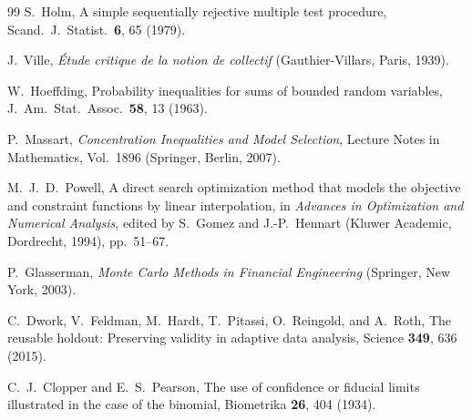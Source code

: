 \documentclass[a4paper,onecolumn,unpublished]{quantumarticle}
\begin{document}
\begin{thebibliography}{99}
 S.~Holm, A simple sequentially rejective multiple test procedure, Scand.\ J.\ Statist.\ \textbf{6}, 65 (1979).

 J.~Ville, \emph{{\'E}tude critique de la notion de collectif} (Gauthier-Villars, Paris, 1939).

 W.~Hoeffding, Probability inequalities for sums of bounded random variables, J.\ Am.\ Stat.\ Assoc.\ \textbf{58}, 13 (1963).

 P.~Massart, \emph{Concentration Inequalities and Model Selection}, Lecture Notes in Mathematics, Vol.~1896 (Springer, Berlin, 2007).

 M.~J.~D.~Powell, A direct search optimization method that models the objective and constraint functions by linear interpolation, in \emph{Advances in Optimization and Numerical Analysis}, edited by S.~Gomez and J.-P.~Hennart (Kluwer Academic, Dordrecht, 1994), pp.~51--67.

 P.~Glasserman, \emph{Monte Carlo Methods in Financial Engineering} (Springer, New York, 2003).

 C.~Dwork, V.~Feldman, M.~Hardt, T.~Pitassi, O.~Reingold, and A.~Roth, The reusable holdout: Preserving validity in adaptive data analysis, Science \textbf{349}, 636 (2015).

 C.~J.~Clopper and E.~S.~Pearson, The use of confidence or fiducial limits illustrated in the case of the binomial, Biometrika \textbf{26}, 404 (1934).

\end{thebibliography}
\end{document}
